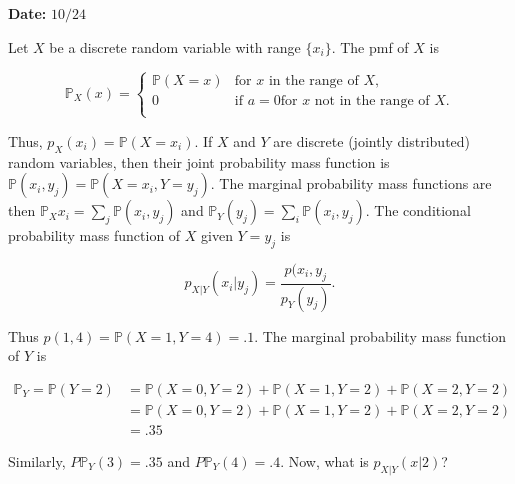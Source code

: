 \documentclass[12pt]{article}
\newcommand{\prob}[1]{\mathbb{P}(#1)}
\begin{document}

\begin{flushright}
\textbf{Date:} $10/24$
\end{flushright}


Let $X$ be a discrete random variable with range $\{ x_i \}$. The pmf of $X$ is 

\begin{equation}
\mathbb{P}_X(x) = \begin{cases} 
	  \prob{X = x} & \text{for $x$ in the range of } X, \\
      0 & \text{if } a = 0 \text{for $x$ not in the range of } X. \\
      \end{cases}
\end{equation}

\noindent
Thus, $p_X(x_i) = \prob{X = x_i}$. If $X$ and $Y$ are discrete (jointly distributed) random variables, then their joint probability mass function is $\prob{x_i, y_j} = \prob{X = x_i, Y=y_j}$. The marginal probability mass functions are then $\mathbb{P}_X{x_i} = \sum_{j} \prob{x_i, y_j}$ and $\mathbb{P}_Y(y_j) = \sum_{i} \prob{x_i, y_j}$. The conditional probability mass function of $X$ given $Y=y_j$ is 

\begin{equation*}
p_{X \lvert Y} (x_i \lvert y_j) = \frac{p(x_i, y_j}{p_Y(y_j)}.
\end{equation*}


\noindent
Thus $p(1,4) = \prob{X = 1, Y = 4} = .1$. The marginal probability mass function of $Y$ is 

\begin{align*}
\mathbb{P}_Y = \prob{Y = 2} & = \prob{X=0, Y=2} + \prob{X=1, Y=2} + \prob{X=2, Y=2} \\
& = \prob{X=0, Y=2} + \prob{X=1, Y=2} + \prob{X=2, Y=2} \\ 
& = .35
\end{align*}

\noindent
Similarly, $P\mathbb{P}_Y (3) = .35$ and  $P\mathbb{P}_Y (4) = .4$. Now, what is $p_{X \lvert Y} (x \lvert 2)$?
\end{document}
